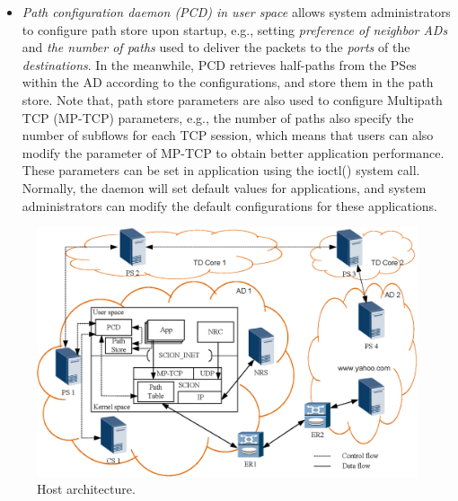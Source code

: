 \begin{itemize}
\item{\em Path configuration daemon (PCD) in user space} allows system administrators
to configure path store upon startup, e.g., setting {\em preference
of neighbor ADs} and {\em the number of paths} used to deliver the
packets to the {\em ports} of the {\em destinations}. In the
meanwhile, PCD retrieves half-paths from the PSes within the AD
according to the configurations, and store them in the path store.
Note that, path store parameters are also used to configure
Multipath TCP (MP-TCP) parameters, e.g., the number of paths also
specify the number of subflows for each TCP session, which means
that users can also modify the parameter of MP-TCP to obtain better
application performance. These parameters can be set in application
using the ioctl() system call. Normally, the daemon will set default
values for applications, and system administrators can modify the
default configurations for these applications.
\end{itemize}


\begin{figure}[ht]
\centering
\begin{minipage}{0.85\textwidth}
\includegraphics[width=1\columnwidth]{./fig/host.eps}
\end{minipage}
\caption{Host architecture.}\label{fig:host}
\end{figure}

